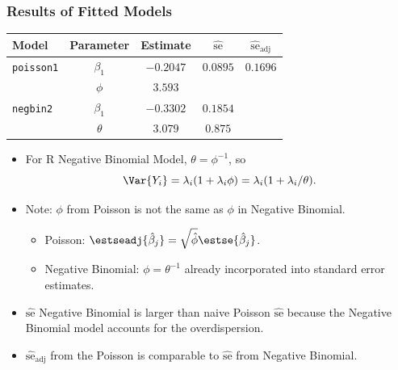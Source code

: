 \documentclass[oneside]{book}\usepackage[]{graphicx}\usepackage[svgnames]{xcolor}
\begin{document}
\subsubsection*{Results of Fitted Models}
\begin{table}[H]
      \centering
      \begin{tabular}{lcccc}
            Model             & Parameter   & Estimate    & $ \widehat{\text{se}} $ & $ \widehat{\text{se}}_{\text{adj}} $ \\
            \midrule
            \texttt{poisson1} & $ \beta_1 $ & $ -0.2047 $ & $ 0.0895 $              & $0.1696$                             \\
                              & $ \phi $    & $3.593$                                                                      \\
            \texttt{negbin2}  & $ \beta_1 $ & $ -0.3302 $ & $ 0.1854 $                                                     \\
                              & $ \theta $  & $3.079$     & $0.875$                                                        \\
            \bottomrule
      \end{tabular}
\end{table}
\begin{itemize}
      \item For R Negative Binomial Model, $ \theta=\phi^{-1} $, so
            \[ \Var{Y_i}=\lambda_i(1+\lambda_i\phi)=\lambda_i(1+\lambda_i/\theta). \]
      \item Note: $ \phi $ from Poisson is not the same as $ \phi $ in Negative Binomial.
            \begin{itemize}
                  \item Poisson: $ \estseadj{\hat{\beta}_j}=\sqrt{\hat{\phi}}\estse{\hat{\beta}_j} $.
                  \item Negative Binomial: $ \phi=\theta^{-1} $ already incorporated into standard error estimates.
            \end{itemize}
      \item $ \widehat{\text{se}} $ Negative Binomial is larger than naive Poisson $ \widehat{\text{se}} $
            because the Negative Binomial model accounts for the overdispersion.
      \item $ \widehat{\text{se}}_{\text{adj}} $ from the Poisson is comparable to $ \widehat{\text{se}} $ from Negative Binomial.
\end{itemize}
\end{document}
